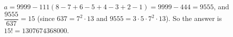 $a=9999-111(8-7+6-5+4-3+2-1)=9999-444=9555$, and $\dfrac{9555}{637}=15$ (since $637=7^2\cdot13$ and $9555=3\cdot5\cdot7^2\cdot13$). So the answer is $15!=\boxed{1307674368000}$.

